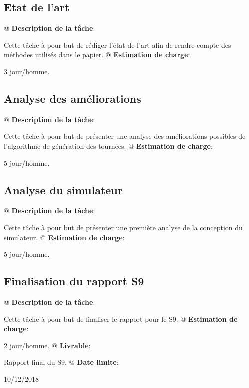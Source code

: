 \documentclass[final]{polytech/polytech}
\begin{document}
		\subsection{Etat de l'art}
			\begin{easylist}
				@ \textbf{Description de la tâche}:
				
				Cette tâche à pour but de rédiger l'état de l'art afin de rendre compte des méthodes utilisés dans le papier.
				@ \textbf{Estimation de charge}:
				
				3 jour/homme.
			\end{easylist}
			
		\subsection{Analyse des améliorations}
			\begin{easylist}
				@ \textbf{Description de la tâche}:
				
				Cette tâche à pour but de présenter une analyse des améliorations possibles de l'algorithme de génération des tournées.
				@ \textbf{Estimation de charge}:
				
				5 jour/homme.
			\end{easylist}
			
		\subsection{Analyse du simulateur}
			\begin{easylist}
				@ \textbf{Description de la tâche}:
				
				Cette tâche à pour but de présenter une première analyse de la conception du simulateur.
				@ \textbf{Estimation de charge}:
				
				5 jour/homme.
			\end{easylist}
			
		\subsection{Finalisation du rapport S9}
			\begin{easylist}
				@ \textbf{Description de la tâche}:
				
				Cette tâche à pour but de finaliser le rapport pour le S9.
				@ \textbf{Estimation de charge}:
				
				2 jour/homme.
				@ \textbf{Livrable}:
				
				Rapport final du S9.
				@ \textbf{Date limite}:
				
				10/12/2018
			\end{easylist}
			
\end{document}
